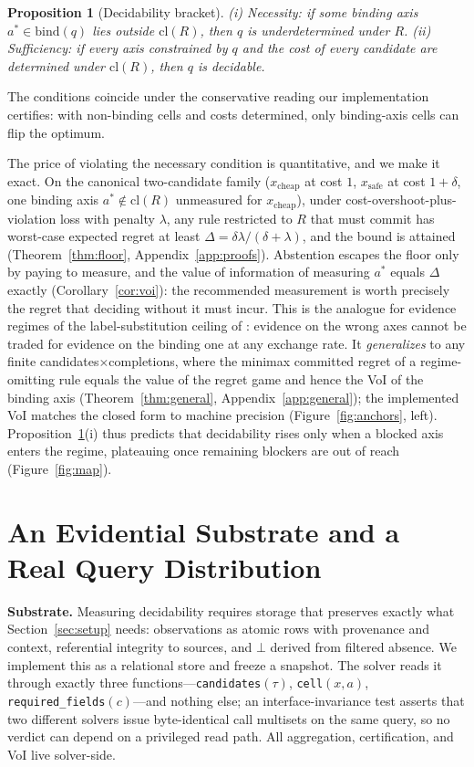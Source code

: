 \documentclass{article} %
\newtheorem{proposition}{Proposition}
\newcommand{\bind}{\mathrm{bind}}
\newcommand{\cl}{\mathrm{cl}}
\newcommand{\bbot}{\bot}
\begin{document}
\begin{proposition}[Decidability bracket]
\label{prop:char}
(i) \emph{Necessity:} if some binding axis $a^* \in \bind(q)$ lies outside $\cl(R)$, then $q$ is underdetermined under $R$.
(ii) \emph{Sufficiency:} if every axis constrained by $q$ and the cost of every candidate are determined under $\cl(R)$, then $q$ is decidable.
\end{proposition}
The conditions coincide under the conservative reading our implementation certifies: with non-binding cells and costs determined, only binding-axis cells can flip the optimum.

The price of violating the necessary condition is quantitative, and we make it exact. On the canonical two-candidate family ($x_{\mathrm{cheap}}$ at cost $1$, $x_{\mathrm{safe}}$ at cost $1{+}\delta$, one binding axis $a^*\notin\cl(R)$ unmeasured for $x_{\mathrm{cheap}}$), under cost-overshoot-plus-violation loss with penalty $\lambda$, any rule restricted to $R$ that must commit has worst-case expected regret at least $\Delta = \delta\lambda/(\delta+\lambda)$, and the bound is attained (Theorem~\ref{thm:floor}, Appendix~\ref{app:proofs}). Abstention escapes the floor only by paying to measure, and the value of information of measuring $a^*$ equals $\Delta$ exactly (Corollary~\ref{cor:voi}): the recommended measurement is worth precisely the regret that deciding without it must incur. This is the analogue for evidence regimes of the label-substitution ceiling of \citet{dorner2025limits}: evidence on the wrong axes cannot be traded for evidence on the binding one at any exchange rate. It \emph{generalizes} to any finite candidates$\times$completions, where the minimax committed regret of a regime-omitting rule equals the value of the regret game and hence the VoI of the binding axis (Theorem~\ref{thm:general}, Appendix~\ref{app:general}); the implemented VoI matches the closed form to machine precision (Figure~\ref{fig:anchors}, left). Proposition~\ref{prop:char}(i) thus predicts that decidability rises only when a blocked axis enters the regime, plateauing once remaining blockers are out of reach (Figure~\ref{fig:map}).

\section{An Evidential Substrate and a Real Query Distribution}
\label{sec:substrate}

\textbf{Substrate.}
Measuring decidability requires storage that preserves exactly what Section~\ref{sec:setup} needs: observations as atomic rows with provenance and context, referential integrity to sources, and $\bbot$ derived from filtered absence. We implement this as a relational store and freeze a snapshot. The solver reads it through exactly three functions---\texttt{candidates}$(\tau)$, \texttt{cell}$(x,a)$, \texttt{required\_fields}$(c)$---and nothing else; an interface-invariance test asserts that two different solvers issue byte-identical call multisets on the same query, so no verdict can depend on a privileged read path. All aggregation, certification, and VoI live solver-side.
\end{document}
